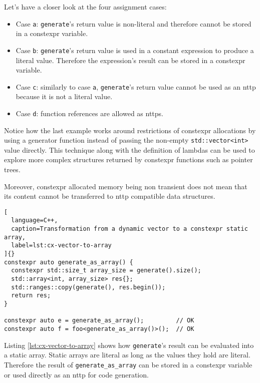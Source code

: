 \documentclass[../main]{subfiles}
\begin{document}
Let's have a closer look at the four assignment cases:

\begin{itemize}
\item Case \lstinline{a}: \lstinline{generate}'s return value is non-literal
      and therefore cannot be stored in a \gls{constexpr} variable.
\item Case \lstinline{b}: \lstinline{generate}'s return value is used in a
      constant expression to produce a literal value.
      Therefore the expression's result can be stored in a \gls{constexpr} variable.
\item Case \lstinline{c}: similarly to case \lstinline{a},
      \lstinline{generate}'s return value cannot be used as an \gls{nttp} because it
      is not a literal value.
\item Case \lstinline{d}: function references are allowed as \glspl{nttp}.
\end{itemize}

Notice how the last example works around restrictions of \gls{constexpr} allocations
by using a generator function instead of passing the non-empty
\lstinline{std::vector<int>} value directly. This technique along with the
definition of lambdas can be used to explore more complex structures returned by
\gls{constexpr} functions such as pointer trees.

Moreover, \gls{constexpr} allocated memory being non transient does not mean that its
content cannot be transferred to \gls{nttp} compatible data structures.

\begin{lstlisting}[
  language=C++,
  caption=Transformation from a dynamic vector to a constexpr static array,
  label=lst:cx-vector-to-array
]{}
constexpr auto generate_as_array() {
  constexpr std::size_t array_size = generate().size();
  std::array<int, array_size> res{};
  std::ranges::copy(generate(), res.begin());
  return res;
}

constexpr auto e = generate_as_array();         // OK
constexpr auto f = foo<generate_as_array()>();  // OK
\end{lstlisting}

Listing \ref{lst:cx-vector-to-array} shows how \lstinline{generate}'s result
can be evaluated into a static array. Static arrays are literal as long
as the values they hold are literal. Therefore the result of
\lstinline{generate_as_array} can be stored in a \gls{constexpr} variable or used
directly as an \gls{nttp} for code generation.
\end{document}
